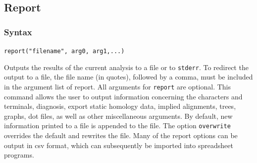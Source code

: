 \subsection{Report}
	\subsubsection{Syntax}
		\texttt{report("filename", arg0, arg1,...)}
	
	\begin{phygdescription}
		{Outputs the results of the current analysis to a file or to \texttt{stderr}. To redirect the 
		output to a file, the file name (in quotes), followed by a comma, must be included in 
		the argument list of report. All arguments for \texttt{report} are optional. This command 
		allows the user to output information concerning the characters and terminals, 
		diagnosis, export static homology data, implied alignments, trees, graphs, dot files, 
		as well as other miscellaneous arguments. By default, new information printed to 
		a file is appended to the file. The option \texttt{overwrite} overrides the default and 
		rewrites the file. Many of the report options can be output in csv format,  which can
		subsequently be imported into spreadsheet programs.}
	\end{phygdescription}
	
